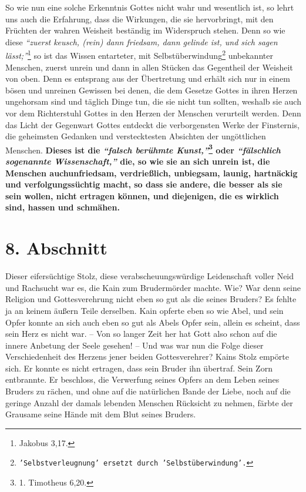 So wie nun eine solche Erkenntnis Gottes nicht wahr und wesentlich ist, so
lehrt uns auch die Erfahrung, dass die Wirkungen, die sie hervorbringt, mit den
Früchten der wahren Weisheit beständig im Widerspruch stehen. Denn so wie diese
\textit{"`zuerst keusch, (rein) dann friedsam, dann gelinde ist, und sich sagen
lässt;"'}\footnote{Jakobus 3,17.}
so ist das Wissen entarteter, mit
Selbstüberwindung\footnote{\texttt{'Selbstverleugnung' ersetzt durch
'Selbstüberwindung'.}}
unbekannter Menschen, zuerst unrein und dann in allen Stücken das Gegentheil
der Weisheit von oben. Denn es entsprang aus der Übertretung und erhält sich
nur in einem bösen und unreinen Gewissen bei denen, die
dem Gesetze Gottes in
ihren Herzen ungehorsam sind und täglich Dinge tun, die sie nicht tun
sollten, weshalb sie auch vor dem Richterstuhl Gottes in den Herzen der
Menschen verurteilt werden. Denn das Licht der Gegenwart Gottes entdeckt die
verborgensten Werke der Finsternis, die geheimsten
Gedanken und verstecktesten
Absichten der ungöttlichen
Menschen. \textbf{Dieses ist die
\textit{"`falsch berühmte Kunst,"'}\footnote{1. Timotheus 6,20.}
 \label{ref:07_07_aroganz}
oder \textit{"`fälschlich sogenannte
Wissenschaft,"'}
die, so wie sie an sich unrein ist, die
Menschen auchunfriedsam, verdrießlich,
unbiegsam, launig, hartnäckig und verfolgungssüchtig macht, so dass sie andere,
die besser als sie sein wollen, nicht ertragen können, und diejenigen, die es
wirklich sind, hassen und schmähen.}

\section{8. Abschnitt} \label{kap7_ab8}

Dieser eifersüchtige Stolz, diese
verabscheuungswürdige Leidenschaft voller Neid
und Rachsucht war es, die Kain zum
Brudermörder machte. Wie? War denn seine
Religion und Gottesverehrung nicht eben so gut als die seines Bruders? Es fehlte
ja an keinem äußern Teile derselben. Kain opferte eben so wie
Abel, und sein
Opfer konnte an sich auch eben so gut als Abels Opfer sein, allein es scheint,
dass sein Herz es nicht war. -- Von so langer Zeit her hat Gott also schon auf
die innere Anbetung der Seele gesehen! -- Und was war nun die Folge dieser
Verschiedenheit des Herzens jener beiden Gottesverehrer? Kains Stolz empörte
sich. Er konnte es nicht ertragen, dass sein Bruder ihn übertraf. Sein Zorn
entbrannte. Er beschloss, die Verwerfung seines Opfers an dem Leben seines
Bruders zu rächen, und ohne auf die natürlichen Bande der Liebe,
noch auf die
geringe Anzahl der damals lebenden Menschen Rücksicht zu nehmen, färbte der
Grausame seine Hände mit dem Blut seines Bruders.

